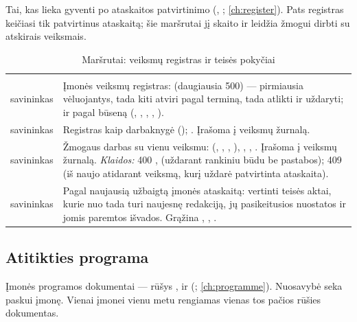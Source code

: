 Tai, kas lieka gyventi po ataskaitos patvirtinimo (,
; \cref{ch:register}). Pats registras keičiasi tik patvirtinus
ataskaitą; šie maršrutai jį skaito ir leidžia žmogui dirbti su atskirais veiksmais.

\begin{xltabular}{\textwidth}{@{}L{19mm}Y@{}}
\caption{Maršrutai: veiksmų registras ir teisės pokyčiai}\label{tab:api:actions}\\
\toprule {} &  \\ \midrule \endfirsthead
\toprule {} &  \\ \midrule \endhead
\bottomrule \endlastfoot
{}
savininkas & Įmonės veiksmų registras:  (daugiausia 500) --- pirmiausia
  vėluojantys, tada kiti atviri pagal terminą, tada atlikti ir uždaryti; ir  pagal
  būseną (, , , , ). \\
\addlinespace
{}
savininkas & Registras kaip darbaknygė (); . Įrašoma į veiksmų
  žurnalą. \\
\addlinespace
{}
savininkas & Žmogaus darbas su vienu veiksmu:  (, ,
  , ), , , . Įrašoma į veiksmų
  žurnalą. \emph{Klaidos:} 400 ,  (uždarant rankiniu būdu
  be pastabos); 409  (iš naujo atidarant veiksmą, kurį uždarė patvirtinta
  ataskaita). \\
\addlinespace
{}
savininkas & Pagal naujausią užbaigtą įmonės ataskaitą: vertinti teisės aktai, kurie nuo tada
  turi naujesnę redakciją, jų pasikeitusios nuostatos ir jomis paremtos išvados. Grąžina
  , , . \\
\end{xltabular}

\subsection{Atitikties programa}\label{sec:api:programme}

Įmonės programos dokumentai --- rūšys ,  ir 
(; \cref{ch:programme}). Nuosavybė seka paskui įmonę. Vienai įmonei
vienu metu rengiamas vienas tos pačios rūšies dokumentas.

